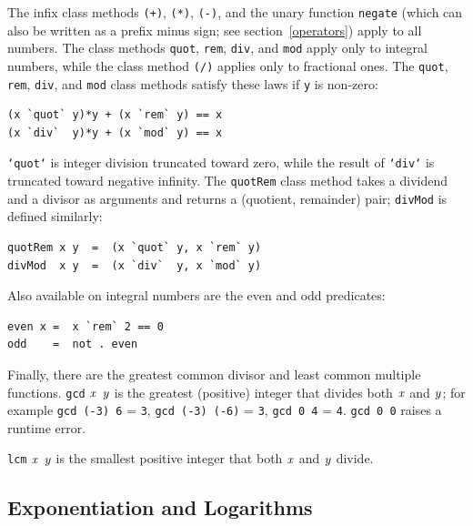 The infix class methods 
\mbox{\tt (+)},
\indextt{+}
\mbox{\tt (*)},
\indextt{*}
\mbox{\tt (-)},
\indextt{-}
and the unary function
\mbox{\tt negate} (which can also be written as a prefix minus sign; see
section~\ref{operators}) apply to all numbers.  The class methods
\mbox{\tt quot}, \mbox{\tt rem}, \mbox{\tt div}, and
\mbox{\tt mod} apply only to integral numbers, while the class method
\mbox{\tt (/)}
\indextt{/}
applies only to fractional ones.  The \mbox{\tt quot}, \mbox{\tt rem},
\mbox{\tt div}, and \mbox{\tt mod} class methods satisfy these laws if \mbox{\tt y} is non-zero:
\bprog
{\small\begin{verbatim}
(x `quot` y)*y + (x `rem` y) == x
(x `div`  y)*y + (x `mod` y) == x
\end{verbatim}}
\eprog
\mbox{\tt `quot`} is integer division truncated toward zero,
while the result of \mbox{\tt `div`} is truncated toward
negative infinity. 
The \mbox{\tt quotRem} class method takes a dividend and a divisor as arguments
and returns a (quotient, remainder) pair; \mbox{\tt divMod} is defined
similarly:
\bprog
{\small\begin{verbatim}
quotRem x y  =  (x `quot` y, x `rem` y)
divMod  x y  =  (x `div`  y, x `mod` y)
\end{verbatim}}
\eprog
Also available on integral numbers are the even and odd predicates:
\bprog
{\small\begin{verbatim}
even x =  x `rem` 2 == 0
odd    =  not . even
\end{verbatim}}
\eprog{}
Finally, there are the greatest common divisor and least common
multiple functions.  \mbox{\tt gcd} \mbox{$\it x$} \mbox{$\it y$} is the greatest
(positive) integer that divides both \mbox{$\it x$} and \mbox{$\it y$}; for example \mbox{\tt gcd\ (-3)\ 6} = \mbox{\tt 3}, \mbox{\tt gcd\ (-3)\ (-6)} = \mbox{\tt 3}, 
\mbox{\tt gcd\ 0\ 4} = \mbox{\tt 4}. \mbox{\tt gcd\ 0\ 0} raises a runtime error.

\mbox{\tt lcm} \mbox{$\it x$} \mbox{$\it y$} is the smallest positive integer that both \mbox{$\it x$} and \mbox{$\it y$} divide.

\subsection{Exponentiation and Logarithms}

